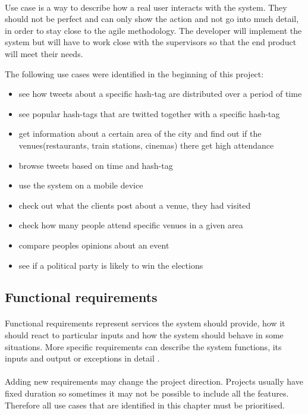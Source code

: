 \documentclass{l4proj}
\begin{document}
\paragraph{}
Use case is a way to describe how a real user interacts with the system. They should not be perfect and can only show the action and not go into much detail, in order to stay close to the agile methodology. The developer will implement the system but will have to work close with the supervisors so that the end product will meet their needs. 

The following use cases were identified in the beginning of this project: 


\begin{itemize}%
	\item see how tweets about a specific hash-tag are distributed over a period of time
	\item see popular hash-tags that are twitted together with a specific hash-tag
	\item get information about a certain area of the city and find out if the venues(restaurants, train stations, cinemas) there get high attendance
	\item browse tweets based on time and hash-tag
	\item use the system on a mobile device
	\item check out what the clients post about a venue, they had visited
	\item check how many people attend specific venues in a given area
	\item compare people\textquotesingle s opinions about an event
	\item see if a political party is likely to win the elections
\end{itemize}


\subsection{Functional requirements} 
\label{sec:functional-requirements}
\paragraph{}
Functional requirements represent services the system should provide, how it should react to particular inputs and how the system should behave in some situations. More specific requirements can describe the system functions, its inputs and output or exceptions in detail \cite{sene}. 
\paragraph{}
Adding new requirements may change the project direction. Projects usually have fixed duration so sometimes it may not be possible to include all the features. Therefore all use cases that are identified in this chapter must be prioritised. 
\end{document}
